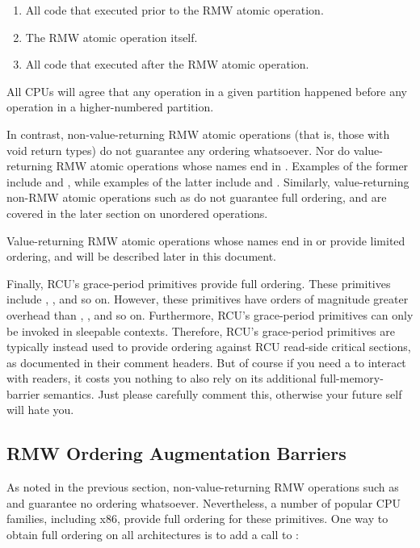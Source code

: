 \begin{enumerate}
 \item	All code that executed prior to the RMW atomic operation.

 \item	The RMW atomic operation itself.

 \item	All code that executed after the RMW atomic operation.
\end{enumerate}

All CPUs will agree that any operation in a given partition happened
before any operation in a higher-numbered partition.

In contrast, non-value-returning RMW atomic operations (that is, those
with void return types) do not guarantee any ordering whatsoever.
Nor do value-returning RMW atomic operations whose names end in .
Examples of the former include  and ,
while examples of the latter include  and
.
Similarly, value-returning non-RMW atomic operations such as
 do not guarantee full ordering, and are covered in
the later section on unordered operations.

Value-returning RMW atomic operations whose names end in  or
 provide limited ordering, and will be described later in this
document.

Finally, RCU's grace-period primitives provide full ordering.
These primitives include , ,
 and so on.
However, these primitives have orders of magnitude greater overhead
than , , and so on.
Furthermore, RCU's grace-period primitives can only be invoked in
sleepable contexts.
Therefore, RCU's grace-period primitives are typically instead used to
provide ordering against RCU read-side critical sections, as documented
in their comment headers.
But of course if you need a  to interact with
readers, it costs you nothing to also rely on its additional
full-memory-barrier semantics.
Just please carefully comment this, otherwise your future self will hate you.


\subsection{RMW Ordering Augmentation Barriers}

As noted in the previous section, non-value-returning RMW operations
such as  and  guarantee no ordering whatsoever.
Nevertheless, a number of popular CPU families, including x86, provide
full ordering for these primitives.
One way to obtain full ordering on all architectures is to add a call
to :

